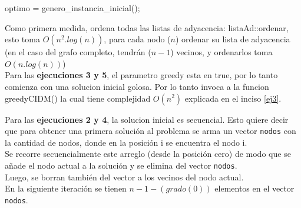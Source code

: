 \begin{algorithm}[h!]
optimo = genero_instancia_inicial();\\
\end{algorithm}

Como primera medida, ordena todas las listas de adyacencia: listaAd::ordenar, esto toma $O(n^2.log(n))$, para cada nodo ($n$) ordenar su lista de adyacencia (en el caso del grafo completo, tendr\'an ($n-1$) vecinos, y ordenarlos toma $O(n.log(n))$)\\

Para las \textbf{ejecuciones 3 y 5}, el parametro greedy esta en true, por lo tanto comienza con una solucion inicial golosa. Por lo tanto invoca a la funcion greedyCIDM() la cual tiene complejidad $O(n^2)$ explicada en el inciso \ref{ej3}.\\

\bigskip

Para las \textbf{ejecuciones 2 y 4}, la solucion inicial es secuencial. Esto quiere decir que para obtener una primera soluci\'on al problema se arma un vector \texttt{nodos} con la cantidad de nodos, donde en la posici\'on i se encuentra el nodo i.\\

Se recorre secuencialmente este arreglo (desde la posici\'on cero) de modo que se a\~nade el nodo actual a la soluci\'on y se elimina del vector \texttt{nodos}.\\

Luego, se borran tambi\'en del vector a los vecinos del nodo actual.\\

En la siguiente iteraci\'on se tienen $n-1-(grado(0))$ elementos en el vector \texttt{nodos}.\\

